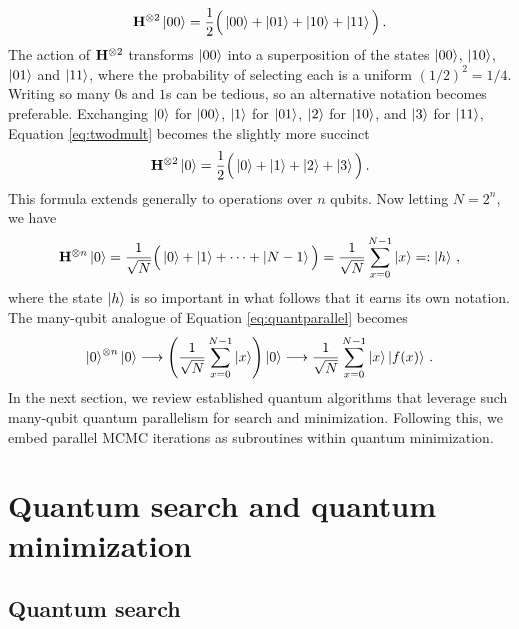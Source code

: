 \documentclass[12pt]{article} %
\begin{document}
\begin{align}\label{eq:twodmult}
\mathbf{H}^{\otimes2} \ket{00} = \frac{1}{2}\Big(\ket{00} + \ket{01} + \ket{10} + \ket{11}\Big) \, .
\end{align}
The action of $\mathbf{H}^{\otimes2}$ transforms $\ket{00}$ into a superposition of the states $\ket{00}$, $\ket{10}$, $\ket{01}$ and $\ket{11}$, where the probability of selecting each is a uniform $(1/2)^2=1/4$. Writing so many $0$s and $1$s can be tedious, so an alternative notation becomes preferable. Exchanging $\ket{0}$ for $\ket{00}$, $\ket{1}$ for $\ket{01}$, $\ket{2}$ for $\ket{10}$, and $\ket{3}$ for $\ket{11}$, Equation \eqref{eq:twodmult} becomes the slightly more succinct
\begin{align*}
\mathbf{H}^{\otimes2} \ket{0} = \frac{1}{2}\Big(\ket{0} + \ket{1} + \ket{2} + \ket{3}\Big) \, .
\end{align*}
This formula extends generally to operations over $n$ qubits.  Now letting $N=2^n$, we have
\begin{align}\label{eq:superpos}
\mathbf{H}^{\otimes n} \ket{0} = \frac{1}{\sqrt{N}}\Big(\ket{0} + \ket{1} + \dots + \ket{N-1}\Big) =  \frac{1}{\sqrt{N}} \sum_{x=0}^{N-1} \ket{x}=:\ket{h} \, ,
\end{align}
where the state $\ket{h}$ is so important in what follows that it earns its own notation. The many-qubit analogue of Equation \eqref{eq:quantparallel} becomes
\begin{align}\label{eq:quantparallel2}
\ket{0}^{\otimes n}\ket{0} \longrightarrow \left(\frac{1}{\sqrt{N}} \sum_{x=0}^{N-1} \ket{x} \right) \ket{0}  \longrightarrow \frac{1}{\sqrt{N}} \sum_{x=0}^{N-1} \ket{x} \ket{f(x)} \, .
\end{align}
In the next section, we review established quantum algorithms that leverage such many-qubit quantum parallelism for search and minimization.  Following this, we embed parallel MCMC iterations as subroutines within quantum minimization.

\section{Quantum search and quantum minimization}

\subsection{Quantum search}
\end{document}
